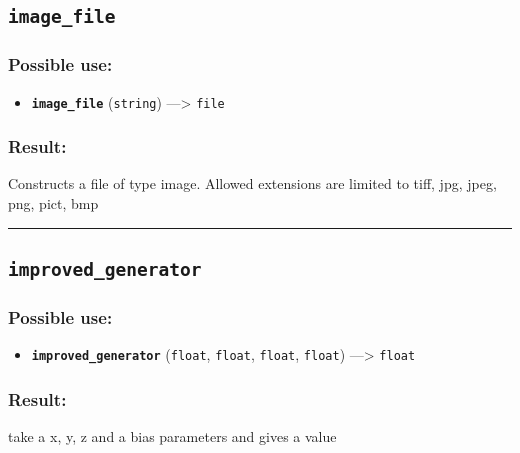 \documentclass[]{book}
\providecommand{\tightlist}{%
  \setlength{\itemsep}{0pt}\setlength{\parskip}{0pt}}
\theoremstyle{definition}
\theoremstyle{definition}
\theoremstyle{definition}
\theoremstyle{remark}
\begin{document}
\subsection{\texorpdfstring{\texttt{image\_file}}{image\_file}}\label{image_file}

\subsubsection{Possible use:}\label{possible-use-264}

\begin{itemize}
\tightlist
\item
  \textbf{\texttt{image\_file}} (\texttt{string}) ---\textgreater{}
  \texttt{file}
\end{itemize}

\subsubsection{Result:}\label{result-254}

Constructs a file of type image. Allowed extensions are limited to tiff,
jpg, jpeg, png, pict, bmp

\begin{center}\rule{0.5\linewidth}{\linethickness}\end{center}

\subsection{\texorpdfstring{\texttt{improved\_generator}}{improved\_generator}}\label{improved_generator}

\subsubsection{Possible use:}\label{possible-use-265}

\begin{itemize}
\tightlist
\item
  \textbf{\texttt{improved\_generator}} (\texttt{float}, \texttt{float},
  \texttt{float}, \texttt{float}) ---\textgreater{} \texttt{float}
\end{itemize}

\subsubsection{Result:}\label{result-255}

take a x, y, z and a bias parameters and gives a value
\end{document}
